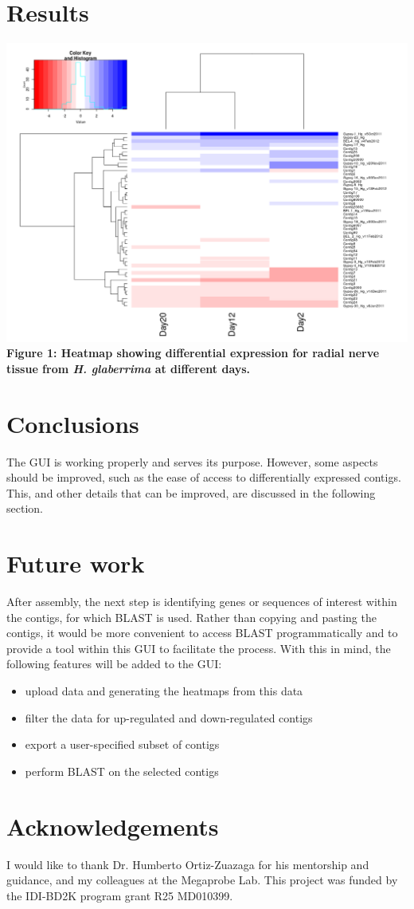 \documentclass[12pt]{article}
\begin{document}
\section{Results}	
  \begin{minipage}[b]{\textwidth}
      \includegraphics[width=\textwidth]{histogram}
      \textbf{Figure 1: Heatmap showing differential expression for radial 					nerve tissue from \textit{H. glaberrima} at different days.}
  \end{minipage} 
\section{Conclusions}
The GUI is working properly and serves its purpose. However, some aspects should be improved, such as the ease of access to differentially expressed contigs. This, and other details that can be improved, are discussed in the following section.

\section{Future work}
After assembly, the next step is identifying genes or sequences of interest within the contigs, for which BLAST is used. Rather than copying and pasting the contigs, it would be more convenient to access BLAST programmatically and to provide a tool within this GUI to facilitate the process. With this in mind, the following features will be added to the GUI: 

\begin{itemize}
  \item upload data and generating the heatmaps from this data	
  \item filter the data for up-regulated and down-regulated contigs	
  \item export a user-specified subset of contigs	
  \item perform BLAST on the selected contigs	
\end{itemize}


\section{Acknowledgements}
I would like to thank Dr. Humberto Ortiz-Zuazaga for his mentorship and guidance, and my colleagues at the Megaprobe Lab. This project was funded by the IDI-BD2K program grant R25 MD010399. 

\nocite{*}


\end{document}
